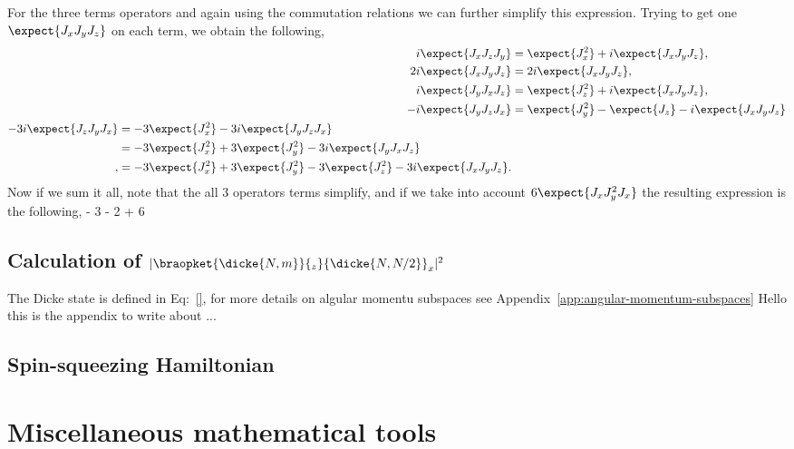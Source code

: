 For the three terms operators and again using the commutation relations we can further simplify this expression. Trying to get one $\expect{J_xJ_yJ_z}$ on each term, we obtain the following,
\begin{subequations}
\begin{align}
  i\expect{J_xJ_zJ_y} & = \expect{J_x^2}+i\expect{J_xJ_yJ_z},
  \label{eq:ap-last-terms-1} \\
  2i\expect{J_xJ_yJ_z} & = 2i\expect{J_xJ_yJ_z},
  \label{eq:ap-last-term-2} \\
  i\expect{J_yJ_xJ_z} & = \expect{J_z^2}+i\expect{J_xJ_yJ_z},
  \label{eq:ap-simplification-3} \\
  -i\expect{J_yJ_zJ_x} & = \expect{J_y^2} - \expect{J_z} - i\expect{J_xJ_yJ_z} \\
\begin{split}
  -3i\expect{J_zJ_yJ_x} & = -3\expect{J_x^2} - 3i \expect{J_yJ_zJ_x} \\
  & = -3\expect{J_x^2} + 3 \expect{J_y^2} - 3i\expect{J_yJ_xJ_z} \\,
  & = -3\expect{J_x^2} + 3 \expect{J_y^2} - 3\expect{J_z^2}
   - 3i \expect{J_xJ_yJ_z}.
  \label{eq:ap-simplification-4}
\end{split}
\end{align}
\end{subequations}
Now if we sum it all, note that the all 3 operators terms simplify, and if we take into account $6\expect{J_xJ_y^2J_x}$ the resulting expression is the following,
 - 3  - 2 + 6
\ee

\subsection{Calculation of $|\braopket{\dicke{N,m}}{_z}{\dicke{N,N/2}}_x|^2$}
\label{app:calculation-dicke-overlap}

The Dicke state is defined in Eq:~\eqref{}, for more details on algular momentu subspaces see Appendix~\ref{app:angular-momentum-subspaces}
Hello this is the appendix to write about ...

\subsection{Spin-squeezing Hamiltonian}

\section{Miscellaneous mathematical tools}

